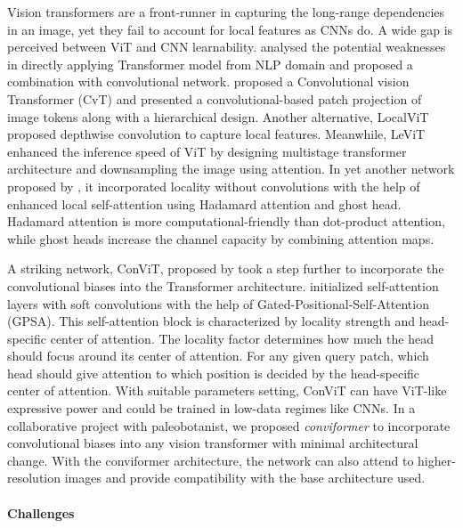 Vision transformers are a front-runner in capturing the long-range dependencies in an image, yet they fail to account for local features as CNNs do. A wide gap is perceived between ViT and CNN learnability. \cite{wu2021cvt,guo2022cmt,yuan2021incorporating,graham2021levit,dai2021coatnet,Peng_2021_ICCV} analysed the potential weaknesses in directly applying Transformer model from NLP domain and proposed a combination with convolutional network. \cite{wu2021cvt} proposed a Convolutional vision Transformer (CvT) and presented a convolutional-based patch projection of image tokens along with a hierarchical design. Another alternative, LocalViT \citep{li2021localvit} proposed depthwise convolution to capture local features.
Meanwhile, LeViT \cite{graham2021levit} enhanced the inference speed of ViT by designing multistage transformer architecture and downsampling the image using attention. In yet another network proposed by \cite{zhou2021elsa}, it incorporated locality without convolutions with the help of enhanced local self-attention using Hadamard attention and ghost head. Hadamard attention is more computational-friendly than dot-product attention, while ghost heads increase the channel capacity by combining attention maps. 

A striking network, ConViT, proposed by \cite{d2021convit} took a step further to incorporate the convolutional biases into the Transformer architecture. \cite{d2021convit} initialized self-attention layers with soft convolutions with the help of Gated-Positional-Self-Attention (GPSA). This self-attention block is characterized by locality strength and head-specific center of attention. The locality factor determines how much the head should focus around its center of attention. For any given query patch, which head should give attention to which position is decided by the head-specific center of attention. With suitable parameters setting, ConViT can have ViT-like expressive power and could be trained in low-data regimes like CNNs. In a collaborative project with paleobotanist, we proposed \textit{conviformer} \citet{vaishnav2022conviformers} to incorporate convolutional biases into any vision transformer with minimal architectural change. With the conviformer architecture, the network can also attend to higher-resolution images and provide compatibility with the base architecture used. 

\paragraph{Challenges}

